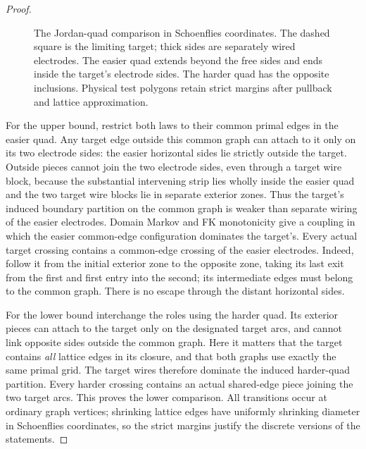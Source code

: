 \begin{proof}
\begin{figure}[tb]
\centering
{}
\caption{The Jordan-quad comparison in Schoenflies coordinates.
The dashed square is the limiting target; thick sides are separately
wired electrodes.  The easier quad extends beyond the free sides and
ends inside the target's electrode sides.  The harder quad has the
opposite inclusions.  Physical test polygons retain strict margins
after pullback and lattice approximation.}
\label{jordan:sandwich-figure}
\end{figure}

For the upper bound, restrict both laws to their common primal edges
in the easier quad.  Any target edge outside this common graph can
attach to it only on its two electrode sides: the easier horizontal
sides lie strictly outside the target.  Outside pieces cannot join
the two electrode sides, even through a target wire block, because
the substantial intervening strip lies wholly inside the easier quad
and the two target wire blocks lie in separate exterior zones.
Thus the target's induced boundary partition on the common graph is
weaker than separate wiring of the easier electrodes.  Domain Markov
and FK monotonicity give a coupling in which the easier common-edge
configuration dominates the target's.  Every actual target crossing
contains a common-edge crossing of the easier electrodes.  Indeed,
follow it from the initial exterior zone to the opposite zone, taking
its last exit from the first and first entry into the second; its
intermediate edges must belong to the common graph.  There is no
escape through the distant horizontal sides.

For the lower bound interchange the roles using the harder quad.
Its exterior pieces can attach to the target only on the designated
target arcs, and cannot link opposite sides outside the common graph.
Here it matters that the target contains \emph{all} lattice edges in
its closure, and that both graphs use exactly the same primal grid.
The target wires therefore dominate the induced harder-quad
partition.  Every harder crossing contains an actual shared-edge
piece joining the two target arcs.  This proves the lower comparison.
All transitions occur at ordinary graph vertices; shrinking lattice
edges have uniformly shrinking diameter in Schoenflies coordinates,
so the strict margins justify the discrete versions of the statements.


\end{proof}
